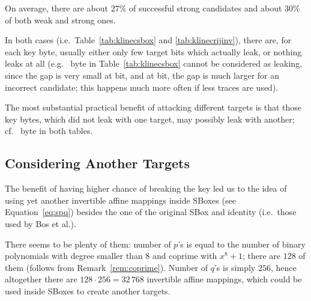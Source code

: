 	On average, there are about $27\%$ of successful strong candidates and about $30\%$ of both weak and strong ones.
	
	In both cases (i.e.\ Table~\ref{tab:klinecsbox} and \ref{tab:klinecrijinv}), there are, for each key byte, usually either only few target bits which actually leak, or nothing leaks at all (e.g.\  byte in Table~\ref{tab:klinecsbox} cannot be considered as leaking, since the gap is very small at  bit, and at  bit, the gap is much larger for an incorrect candidate; this happens much more often if less traces are used).
	
	The most substantial practical benefit of attacking different targets is that those key bytes, which did not leak with one target, may possibly leak with another; cf.\  byte in both tables.



\subsection{Considering Another Targets}
\label{sec:16targets}

The benefit of having higher chance of breaking the key led us to the idea of using yet another invertible affine mappings inside SBoxes (see Equation~\ref{eq:spq}) besides the one of the original SBox and identity (i.e.\ those used by Bos et al.).

There seems to be plenty of them: number of $p$'s is equal to the number of binary polynomials with degree smaller than $8$ and coprime with $x^8+1$; there are $128$ of them (follows from Remark~\ref{rem:coprime}). Number of $q$'s is simply $256$, hence altogether there are $128\cdot 256 = 32\,768$ invertible affine mappings, which could be used inside SBoxes to create another targets.


